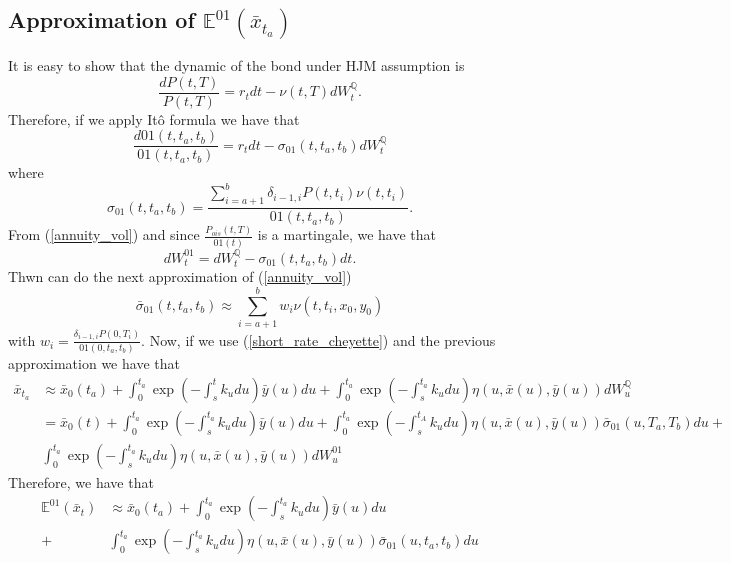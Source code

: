\documentclass[a4paper,10pt]{article}
\newcommand{\1}{\mathbf{1}}
\begin{document}
\subsection{Approximation of $\mathbb{E}^{01}\left(\bar{x}_{t_a}\right)$}
It is easy to show that the dynamic of the bond under HJM assumption is
\begin{equation}
\frac{dP(t,T)}{P(t,T)} = r_t dt - \nu(t,T)dW^{\mathbb{Q}}_t.  
\end{equation}
Therefore, if we apply Itô formula we have that 
\begin{equation}\label{annuity_spot_dynamic}
\frac{d01(t,t_a,t_b)}{01(t,t_a,t_b)} = r_t dt - \sigma_{01}(t,t_a,t_b)dW^{\mathbb{Q}}_t
\end{equation}
where 
\begin{equation} \label{annuity_vol}
\sigma_{01}(t,t_a,t_b) = \frac{\sum_{i=a+1}^{b} \delta_{i-1,i} P(t,t_i) \nu(t,t_i)}{01(t,t_a,t_b)}.
\end{equation}
From (\ref{annuity_vol}) and since $\frac{P_{ois}(t,T)}{01(t)}$ is a martingale, we have that
\begin{equation*}
dW^{01}_t = dW^{\mathbb{Q}}_t - \sigma_{01}(t,t_a,t_b)dt. 
\end{equation*}
Thwn can do the next approximation of (\ref{annuity_vol})
\begin{equation} \label{approximation_o1_vol}
\bar{\sigma}_{01}(t,t_a,t_b) \approx \sum_{i=a+1}^{b} w_i \nu(t,t_i,x_0,y_0)
\end{equation}
with $w_i=\frac{\delta_{i-1,i} P(0,T_i)}{01(0,t_a,t_b)}$. Now, if we use (\ref{short_rate_cheyette}) and the previous approximation we have that
\begin{align}
\bar{x}_{t_a} &\approx \bar{x}_0(t_a)  + \int_{0}^{t_a} \exp\left(-\int_{s}^{t}k_u du\right) \bar{y}(u) du + \int_{0}^{t_a}  \exp\left(-\int_{s}^{t_a}k_u du \right) \eta(u,\bar{x}(u),\bar{y}(u)) dW_u^{\mathbb{Q}} \nonumber \\
&=  \bar{x}_0(t)  + \int_{0}^{t_a} \exp\left(-\int_{s}^{t_a}k_u du\right) \bar{y}(u) du + \int_{0}^{t_a} \exp\left(-\int_{s}^{t_A}k_u du \right) \eta(u,\bar{x}(u),\bar{y}(u)) \bar{\sigma}_{01}(u, T_a, T_b) du  + \nonumber \\ 
& \int_{0}^{t_a} \exp\left(-\int_{s}^{t_a}k_u du \right) \eta(u,\bar{x}(u),\bar{y}(u)) dW_u^{01} 
\end{align}
Therefore, we have that
\begin{align}
\mathbb{E}^{01}\left(\bar{x}_t\right) &\approx \bar{x}_0(t_a)  + \int_{0}^{t_a} \exp\left(-\int_{s}^{t_a}k_u du\right) \bar{y}(u) du \nonumber \\ 
+ &\int_{0}^{t_a} \exp\left(-\int_{s}^{t_a}k_u du \right) \eta(u,\bar{x}(u),\bar{y}(u)) \bar{\sigma}_{01}(u, t_a, t_b) du
\end{align}
\end{document}
